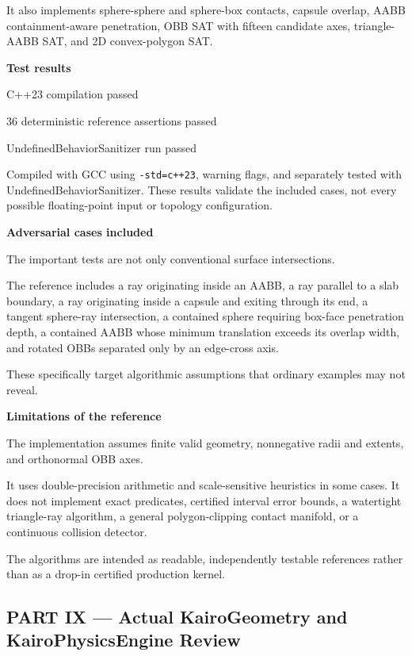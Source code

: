 It also implements sphere-sphere and sphere-box contacts, capsule overlap, AABB containment-aware penetration, OBB SAT with fifteen candidate axes, triangle-AABB SAT, and 2D convex-polygon SAT.

\textbf{Test results}

C++23 compilation passed

36 deterministic reference assertions passed

UndefinedBehaviorSanitizer run passed

Compiled with GCC using \texttt{-std=c++23}, warning flags, and separately tested with UndefinedBehaviorSanitizer. These results validate the included cases, not every possible floating-point input or topology configuration.

\textbf{Adversarial cases included}

The important tests are not only conventional surface intersections.

The reference includes a ray originating inside an AABB, a ray parallel to a slab boundary, a ray originating inside a capsule and exiting through its end, a tangent sphere-ray intersection, a contained sphere requiring box-face penetration depth, a contained AABB whose minimum translation exceeds its overlap width, and rotated OBBs separated only by an edge-cross axis.

These specifically target algorithmic assumptions that ordinary examples may not reveal.

\textbf{Limitations of the reference}

The implementation assumes finite valid geometry, nonnegative radii and extents, and orthonormal OBB axes.

It uses double-precision arithmetic and scale-sensitive heuristics in some cases. It does not implement exact predicates, certified interval error bounds, a watertight triangle-ray algorithm, a general polygon-clipping contact manifold, or a continuous collision detector.

The algorithms are intended as readable, independently testable references rather than as a drop-in certified production kernel.

\subsection{PART IX --- Actual KairoGeometry and KairoPhysicsEngine Review}\label{04-visual-computing-ii-ch025-part-ix-actual-kairogeometry-and-kairophysicsengine-review}

